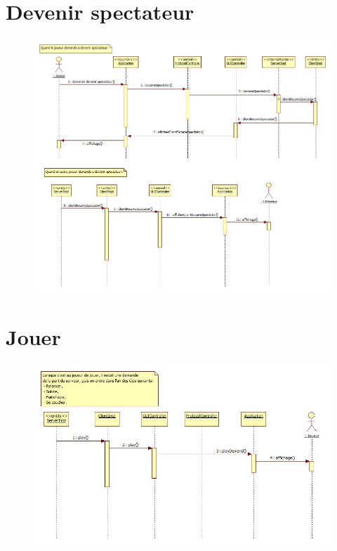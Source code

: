 \section{Devenir spectateur}
\begin{figure}[ht]
	\centering \includegraphics[angle=90, width=\linewidth]{figures/DetailedBecomingSpectatorSequenceDiagram.jpg}
\end{figure}
\clearpage
\section{Jouer}
\begin{figure}[ht]
	\centering \includegraphics[angle=90, width=.7\linewidth]{figures/DetailedPlaySequenceDiagram.jpg}
\end{figure}
\clearpage
